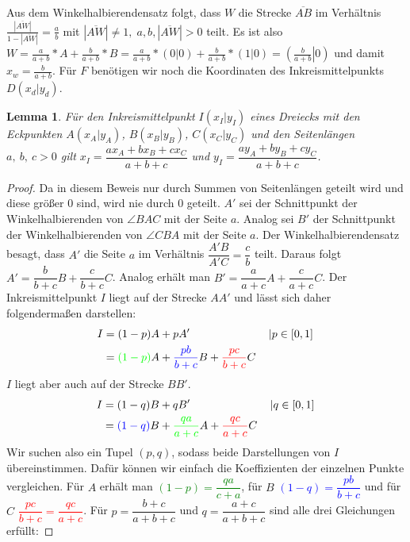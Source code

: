 \documentclass{article}
\newtheorem{lemma}{Lemma}
\newcommand{\strecke}[1]{\left|\overline{#1}\right|}
\begin{document}
	\noindent Aus dem Winkelhalbierendensatz folgt, dass $W$ die Strecke $\overline{AB}$ im Verhältnis $\frac{\strecke{AW}}{1-\strecke{AW}} = \frac{a}{b}$ mit $\strecke{AW} \neq 1,\; a,b, \strecke{AW}>0$ teilt.
	Es ist also $W = \frac{a}{a+b}*A + \frac{b}{a+b}*B = \frac{a}{a+b}*(0|0) + \frac{b}{a+b}*(1|0) = \left(\left.\frac{b}{a+b}\right|0\right)$ und damit $x_w = \frac{b}{a+b}$.
	Für $F$ benötigen wir noch die Koordinaten des Inkreismittelpunkts $D(x_d|y_d)$.
    \begin{lemma}
        Für den Inkreismittelpunkt $I(x_I|y_I)$ eines Dreiecks mit den Eckpunkten $A(x_A|y_A)$, $B(x_B|y_B)$, $C(x_C|y_C)$ und den Seitenlängen $a,\ b,\ c>0$ gilt $x_I = \dfrac{ax_{A}+bx_{B}+cx_{C}}{a+b+c}$ und $y_I = \dfrac {ay_{A}+by_{B}+cy_{C}}{a+b+c}$.
   \end{lemma}
   \begin{proof}
   	Da in diesem Beweis nur durch Summen von Seitenlängen geteilt wird und diese größer 0 sind, wird nie durch 0 geteilt.
   	$A'$ sei der Schnittpunkt der Winkelhalbierenden von $\angle BAC$ mit der Seite $a$.
   	Analog sei $B'$ der Schnittpunkt der Winkelhalbierenden von $\angle CBA$ mit der Seite $a$.
   	Der Winkelhalbierendensatz besagt, dass $A'$ die Seite $a$ im Verhältnis $\dfrac{A'B}{A'C}=\dfrac{c}{b}$ teilt. Daraus folgt $A'=\dfrac{b}{b+c}B+\dfrac{c}{b+c}C$.
   	Analog erhält man $B'=\dfrac{a}{a+c}A+\dfrac{c}{a+c}C$.
   	Der Inkreismittelpunkt $I$ liegt auf der Strecke $AA'$ und lässt sich daher folgendermaßen darstellen:
   	\begin{align*}
   	I&= (1-p)A+pA'&&\left|p\in [0,1]\right.\\
   	&= \textcolor{green}{(1-p)}A+\textcolor{blue}{\dfrac{pb}{b+c}}B+\textcolor{red}{\dfrac{pc}{b+c}}C
   	\end{align*}
   	$I$ liegt aber auch auf der Strecke $BB'$.
   	\begin{align*}
   	I&= (1-q)B+qB'&&\left|q\in [0,1]\right.\\
   	&= \textcolor{blue}{(1-q)}B+\textcolor{green}{\dfrac{qa}{a+c}}A+\textcolor{red}{\dfrac{qc}{a+c}}C
   	\end{align*}
   	Wir suchen also ein Tupel $(p,q)$, sodass beide Darstellungen von $I$ übereinstimmen.
   	Dafür können wir einfach die Koeffizienten der einzelnen Punkte vergleichen.
   	Für $A$ erhält man \textcolor{green}{$(1-p) = \dfrac{qa}{c+a}$}, für $B$ \textcolor{blue}{$(1-q) = \dfrac{pb}{b+c}$} und für $C$ \textcolor{red}{$\dfrac{pc}{b+c} = \dfrac{qc}{a+c}$}. Für $p = \dfrac{b+c}{a+b+c}$ und $q = \dfrac{a+c}{a+b+c}$ sind alle drei Gleichungen erfüllt:

\end{proof}
\end{document}
